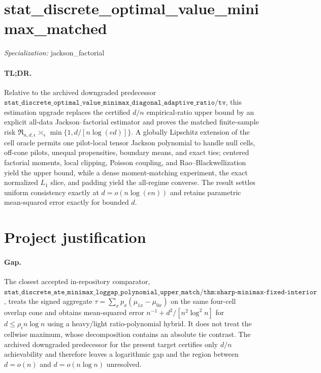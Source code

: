 \documentclass{article}
\begin{document}
\sloppy

\section*{stat\_\allowbreak{}discrete\_\allowbreak{}optimal\_\allowbreak{}value\_\allowbreak{}minimax\_\allowbreak{}matched}

\noindent\textit{Specialization:} jackson\_\allowbreak{}factorial\par

\paragraph{TL;DR.} Relative to the archived downgraded predecessor \(\texttt{stat\_discrete\_optimal\_value\_minimax\_diagonal\_adaptive\_ratio}/\texttt{tv}\), this estimation upgrade replaces the certified \(d/n\) empirical-ratio upper bound by an explicit all-data Jackson--factorial estimator and proves the matched finite-sample risk \(\mathfrak R_{n,d,\epsilon}\asymp_\epsilon\min\{1,d/[n\log(ed)]\}\). A globally Lipschitz extension of the cell oracle permits one pilot-local tensor Jackson polynomial to handle null cells, off-cone pilots, unequal propensities, boundary means, and exact ties; centered factorial moments, local clipping, Poisson coupling, and Rao--Blackwellization yield the upper bound, while a dense moment-matching experiment, the exact normalized \(L_1\) slice, and padding yield the all-regime converse. The result settles uniform consistency exactly at \(d=o(n\log(en))\) and retains parametric mean-squared error exactly for bounded \(d\).

\section{Project justification}

\paragraph{Gap.} The closest accepted in-repository comparator, \(\texttt{stat\_discrete\_ate\_minimax\_loggap\_polynomial\_upper\_match}/\texttt{thm:sharp-minimax-fixed-interior}\), treats the signed aggregate \(\tau=\sum_xp_x(\mu_{1x}-\mu_{0x})\) on the same four-cell overlap cone and obtains mean-squared error \(n^{-1}+d^2/[n^2\log^2 n]\) for \(d\leq\rho_\epsilon n\log n\) using a heavy/light ratio-polynomial hybrid. It does not treat the cellwise maximum, whose decomposition contains an absolute tie contrast. The archived downgraded predecessor for the present target certifies only \(d/n\) achievability and therefore leaves a logarithmic gap and the region between \(d=o(n)\) and \(d=o(n\log n)\) unresolved.
\end{document}
